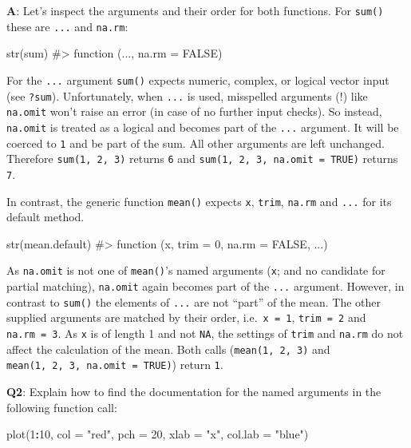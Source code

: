 \documentclass[
]{krantz}
\makeatletter
\newenvironment{Shaded}{\begin{snugshade}}{\end{snugshade}}
\newcommand{\CommentTok}[1]{\textcolor[rgb]{0.56,0.35,0.01}{\textit{#1}}}
\newcommand{\DataTypeTok}[1]{\textcolor[rgb]{0.13,0.29,0.53}{#1}}
\newcommand{\DecValTok}[1]{\textcolor[rgb]{0.00,0.00,0.81}{#1}}
\newcommand{\KeywordTok}[1]{\textcolor[rgb]{0.13,0.29,0.53}{\textbf{#1}}}
\newcommand{\NormalTok}[1]{#1}
\newcommand{\OperatorTok}[1]{\textcolor[rgb]{0.81,0.36,0.00}{\textbf{#1}}}
\newcommand{\StringTok}[1]{\textcolor[rgb]{0.31,0.60,0.02}{#1}}
\newenvironment{kframe}{%
\medskip{}
\setlength{\fboxsep}{.8em}
 \def\at@end@of@kframe{}%
 \ifinner\ifhmode%
  \def\at@end@of@kframe{\end{minipage}}%
  \begin{minipage}{\columnwidth}%
 \fi\fi%
 \def\FrameCommand##1{\hskip\@totalleftmargin \hskip-\fboxsep
 \colorbox{shadecolor}{##1}\hskip-\fboxsep
     \hskip-\linewidth \hskip-\@totalleftmargin \hskip\columnwidth}%
 \MakeFramed {\advance\hsize-\width
   \@totalleftmargin\z@ \linewidth\hsize
   \@setminipage}}%
 {\par\unskip\endMakeFramed%
 \at@end@of@kframe}
\renewenvironment{Shaded}{\begin{kframe}}{\end{kframe}}
\renewcommand{\KeywordTok} [1]{\textcolor[rgb]{0.00,0.44,0.13}{{#1}}}
\renewcommand{\DataTypeTok}[1]{\textcolor[rgb]{0.56,0.13,0.00}{{#1}}}
\renewcommand{\DecValTok}  [1]{\textcolor[rgb]{0.25,0.63,0.44}{{#1}}}
\renewcommand{\StringTok}  [1]{\textcolor[rgb]{0.25,0.44,0.63}{{#1}}}
\renewcommand{\CommentTok} [1]{\textcolor[rgb]{0.38,0.63,0.69}{{#1}}}
\renewcommand{\NormalTok}  [1]{{#1}}
\makeatother
\begin{document}
\textbf{{A}}: Let's inspect the arguments and their order for both functions. For \texttt{sum()} these are \texttt{...} and \texttt{na.rm}:

\begin{Shaded}
\begin{Highlighting}[]
\KeywordTok{str}\NormalTok{(sum)}
\CommentTok{#> function (..., na.rm = FALSE)}
\end{Highlighting}
\end{Shaded}

For the \texttt{...} argument \texttt{sum()} expects numeric, complex, or logical vector input (see \texttt{?sum}). Unfortunately, when \texttt{...} is used, misspelled arguments (!) like \texttt{na.omit} won't raise an error (in case of no further input checks). So instead, \texttt{na.omit} is treated as a logical and becomes part of the \texttt{...} argument. It will be coerced to \texttt{1} and be part of the sum. All other arguments are left unchanged. Therefore \texttt{sum(1,\ 2,\ 3)} returns \texttt{6} and \texttt{sum(1,\ 2,\ 3,\ na.omit\ =\ TRUE)} returns \texttt{7}.

In contrast, the generic function \texttt{mean()} expects \texttt{x}, \texttt{trim}, \texttt{na.rm} and \texttt{...} for its default method.

\begin{Shaded}
\begin{Highlighting}[]
\KeywordTok{str}\NormalTok{(mean.default)}
\CommentTok{#> function (x, trim = 0, na.rm = FALSE, ...)}
\end{Highlighting}
\end{Shaded}

As \texttt{na.omit} is not one of \texttt{mean()}'s named arguments (\texttt{x}; and no candidate for partial matching), \texttt{na.omit} again becomes part of the \texttt{...} argument. However, in contrast to \texttt{sum()} the elements of \texttt{...} are not ``part'' of the mean. The other supplied arguments are matched by their order, i.e.~\texttt{x\ =\ 1}, \texttt{trim\ =\ 2} and \texttt{na.rm\ =\ 3}. As \texttt{x} is of length 1 and not \texttt{NA}, the settings of \texttt{trim} and \texttt{na.rm} do not affect the calculation of the mean. Both calls (\texttt{mean(1,\ 2,\ 3)} and \texttt{mean(1,\ 2,\ 3,\ na.omit\ =\ TRUE)}) return \texttt{1}.

\textbf{{Q2}}: Explain how to find the documentation for the named arguments in the following function call:

\begin{Shaded}
\begin{Highlighting}[]
\KeywordTok{plot}\NormalTok{(}\DecValTok{1}\OperatorTok{:}\DecValTok{10}\NormalTok{, }\DataTypeTok{col =} \StringTok{"red"}\NormalTok{, }\DataTypeTok{pch =} \DecValTok{20}\NormalTok{, }\DataTypeTok{xlab =} \StringTok{"x"}\NormalTok{, }\DataTypeTok{col.lab =} \StringTok{"blue"}\NormalTok{)}
\end{Highlighting}
\end{Shaded}
\end{document}
